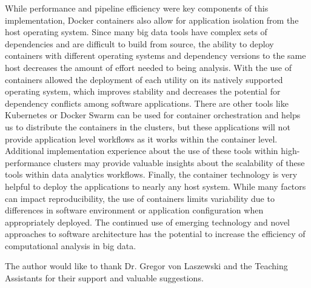 \documentclass[sigconf]{acmart}
\begin{document}
	While performance and pipeline efficiency were key components of this implementation, Docker containers also allow for application isolation from the host operating system. Since many big data tools have complex sets of dependencies and are difficult to build from source, the ability to deploy containers with different operating systems and dependency versions to the same host decreases the amount of effort needed to being analysis. With the use of containers allowed the deployment of each utility on its natively supported operating system, which improves stability and decreases the potential for dependency conflicts among software applications.
	There are other tools like Kubernetes or Docker Swarm can be used for container orchestration and helps us to distribute the containers in the clusters, but these applications will not provide application level workflows as it works within the container level. Additional implementation experience about the use of these tools within high-performance clusters may provide valuable insights about the scalability of these tools within data analytics workflows.
	Finally, the container technology is very helpful to deploy the applications to nearly any host system. While many factors can impact reproducibility, the use of containers limits variability due to differences in software environment or application configuration when appropriately deployed. The continued use of emerging technology and novel approaches to software architecture has the potential to increase the efficiency of computational analysis in big data. \cite{MongoDbWhitePaper}

\begin{acks}		
	
	The author would like to thank Dr. Gregor von Laszewski and the Teaching Assistants for their support and valuable suggestions.
	
\end{acks}


 
\end{document}
